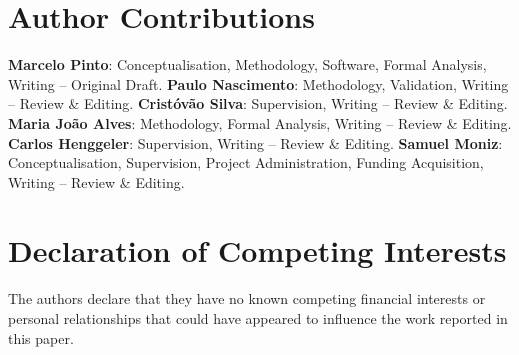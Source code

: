 \section*{Author Contributions}
\textbf{Marcelo Pinto}: Conceptualisation, Methodology, Software,
Formal Analysis, Writing -- Original Draft.
\textbf{Paulo Nascimento}: Methodology, Validation, Writing --
Review \& Editing.
\textbf{Crist\'ov\~ao Silva}: Supervision, Writing -- Review \&
Editing.
\textbf{Maria Jo\~ao Alves}: Methodology, Formal Analysis, Writing
-- Review \& Editing.
\textbf{Carlos Henggeler}: Supervision, Writing -- Review \&
Editing.
\textbf{Samuel Moniz}: Conceptualisation, Supervision, Project
Administration, Funding Acquisition, Writing -- Review \& Editing.

\section*{Declaration of Competing Interests}
The authors declare that they have no known competing financial
interests or personal relationships that could have appeared to
influence the work reported in this paper.
